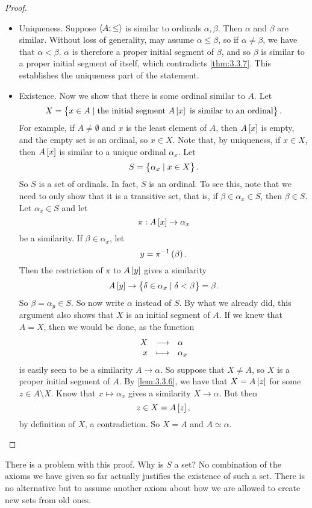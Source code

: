 \begin{proof}
\hfill
\begin{itemize}
\item Uniqueness. Suppose $ \left\langle A; \le \right\rangle $ is similar to ordinals $ \alpha, \beta $. Then $ \alpha $ and $ \beta $ are similar. Without loss of generality, may assume $ \alpha \le \beta $, so if $ \alpha \ne \beta $, we have that $ \alpha < \beta $. $ \alpha $ is therefore a proper initial segment of $ \beta $, and so $ \beta $ is similar to a proper initial segment of itself, which contradicts \ref{thm:3.3.7}. This establishes the uniqueness part of the statement.
\item Existence. Now we show that there is some ordinal similar to $ A $. Let
$$ X = \cbr{x \in A \mid \text{the initial segment} \ A\sbr{x} \ \text{is similar to an ordinal}}. $$
For example, if $ A \ne \emptyset $ and $ x $ is the least element of $ A $, then $ A\sbr{x} $ is empty, and the empty set is an ordinal, so $ x \in X $. Note that, by uniqueness, if $ x \in X $, then $ A\sbr{x} $ is similar to a unique ordinal $ \alpha_x $. Let
$$ S = \cbr{\alpha_x \mid x \in X}. $$
So $ S $ is a set of ordinals. In fact, $ S $ is an ordinal. To see this, note that we need to only show that it is a transitive set, that is, if $ \beta \in \alpha_x \in S $, then $ \beta \in S $. Let $ \alpha_x \in S $ and let
$$ \pi : A\sbr{x} \to \alpha_x $$
be a similarity. If $ \beta \in \alpha_x $, let
$$ y = \pi^{-1}\br{\beta}. $$
Then the restriction of $ \pi $ to $ A\sbr{y} $ gives a similarity
$$ A\sbr{y} \to \cbr{\delta \in \alpha_x \mid \delta < \beta} = \beta. $$
So $ \beta = \alpha_y \in S $. So now write $ \alpha $ instead of $ S $. By what we already did, this argument also shows that $ X $ is an initial segment of $ A $. If we knew that $ A = X $, then we would be done, as the function
$$ \function{X}{\alpha}{x}{\alpha_x} $$
is easily seen to be a similarity $ A \to \alpha $. So suppose that $ X \ne A $, so $ X $ is a proper initial segment of $ A $. By \ref{lem:3.3.6}, we have that $ X = A\sbr{z} $ for some $ z \in A \setminus X $. Know that $ x \mapsto \alpha_x $ gives a similarity $ X \to \alpha $. But then
$$ z \in X = A\sbr{z}, $$
by definition of $ X $, a contradiction. So $ X = A $ and $ A \simeq \alpha $.
\end{itemize}
\end{proof}


There is a problem with this proof. Why is $ S $ a set? No combination of the axioms we have given so far actually justifies the existence of such a set. There is no alternative but to assume another axiom about how we are allowed to create new sets from old ones.

